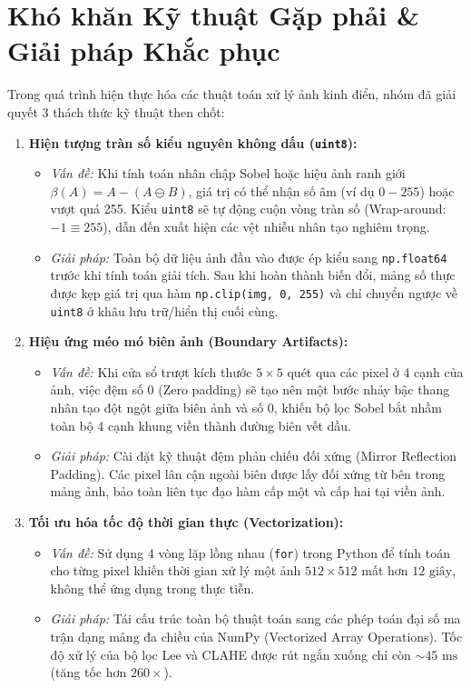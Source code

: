 \section{Khó khăn Kỹ thuật Gặp phải \& Giải pháp Khắc phục}
Trong quá trình hiện thực hóa các thuật toán xử lý ảnh kinh điển, nhóm đã giải quyết 3 thách thức kỹ thuật then chốt:
\begin{enumerate}
    \item \textbf{Hiện tượng tràn số kiểu nguyên không dấu (\texttt{uint8}):}
    \begin{itemize}
        \item \textit{Vấn đề:} Khi tính toán nhân chập Sobel hoặc hiệu ảnh ranh giới $\beta(A) = A - (A \ominus B)$, giá trị có thể nhận số âm (ví dụ $0 - 255$) hoặc vượt quá 255. Kiểu \texttt{uint8} sẽ tự động cuộn vòng tràn số (Wrap-around: $-1 \equiv 255$), dẫn đến xuất hiện các vệt nhiễu nhân tạo nghiêm trọng.
        \item \textit{Giải pháp:} Toàn bộ dữ liệu ảnh đầu vào được ép kiểu sang \texttt{np.float64} trước khi tính toán giải tích. Sau khi hoàn thành biến đổi, mảng số thực được kẹp giá trị qua hàm \texttt{np.clip(img, 0, 255)} và chỉ chuyển ngược về \texttt{uint8} ở khâu lưu trữ/hiển thị cuối cùng.
    \end{itemize}
    \item \textbf{Hiệu ứng méo mó biên ảnh (Boundary Artifacts):}
    \begin{itemize}
        \item \textit{Vấn đề:} Khi cửa sổ trượt kích thước $5 \times 5$ quét qua các pixel ở 4 cạnh của ảnh, việc đệm số 0 (Zero padding) sẽ tạo nên một bước nhảy bậc thang nhân tạo đột ngột giữa biên ảnh và số 0, khiến bộ lọc Sobel bắt nhầm toàn bộ 4 cạnh khung viền thành đường biên vết dầu.
        \item \textit{Giải pháp:} Cài đặt kỹ thuật đệm phản chiếu đối xứng (Mirror Reflection Padding). Các pixel lân cận ngoài biên được lấy đối xứng từ bên trong mảng ảnh, bảo toàn liên tục đạo hàm cấp một và cấp hai tại viền ảnh.
    \end{itemize}
    \item \textbf{Tối ưu hóa tốc độ thời gian thực (Vectorization):}
    \begin{itemize}
        \item \textit{Vấn đề:} Sử dụng 4 vòng lặp lồng nhau (\texttt{for}) trong Python để tính toán cho từng pixel khiến thời gian xử lý một ảnh $512 \times 512$ mất hơn $12\text{ giây}$, không thể ứng dụng trong thực tiễn.
        \item \textit{Giải pháp:} Tái cấu trúc toàn bộ thuật toán sang các phép toán đại số ma trận dạng mảng đa chiều của NumPy (Vectorized Array Operations). Tốc độ xử lý của bộ lọc Lee và CLAHE được rút ngắn xuống chỉ còn $\sim 45\text{ ms}$ (tăng tốc hơn $260\times$).
    \end{itemize}
\end{enumerate}



